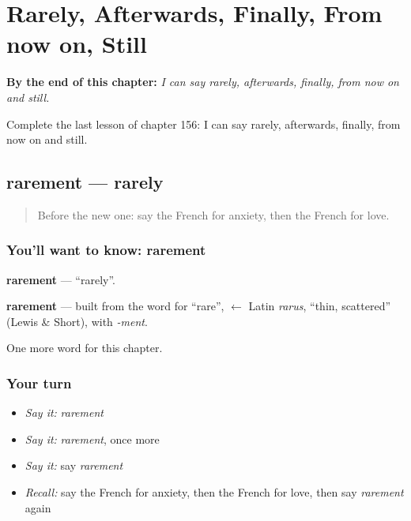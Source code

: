 
\chapter{Rarely, Afterwards, Finally, From now on, Still}
\label{ch:fr-rarely-afterwards-finally-from-now-on-still}

\begin{chapteropening}
\textbf{By the end of this chapter:} \emph{I can say rarely, afterwards, finally, from now on and still.}

Complete the last lesson of chapter 156: I can say rarely, afterwards, finally, from now on and still.
\end{chapteropening}

\section[rarement]{rarement — rarely}

\label{lesson:FR-C156-rarement}



\begin{quote}
Before the new one: say the French for anxiety, then the French for love.
\end{quote}

\subsection*{You'll want to know: rarement}
\textbf{rarement} — \textquotedblleft{}rarely\textquotedblright{}.

\begin{cousinweb}
\textbf{rarement} — built from the word for \textquotedblleft{}rare\textquotedblright{}, $\leftarrow$ Latin \emph{rarus}, \textquotedblleft{}thin, scattered\textquotedblright{} (Lewis \& Short), with \emph{-ment}.
\end{cousinweb}

\begin{grammarlens}[title={What you've built}]
One more word for this chapter.
\end{grammarlens}

\subsection*{Your turn}
\begin{itemize}
\raggedright
  \item \emph{Say it:} \emph{rarement}
  \item \emph{Say it:} \emph{rarement}, once more
  \item \emph{Say it:} say \emph{rarement}
  \item \emph{Recall:} say the French for anxiety, then the French for love, then say \emph{rarement} again
\end{itemize}

